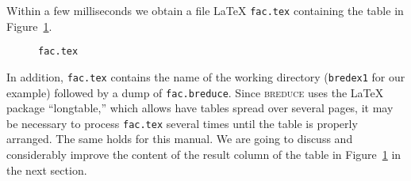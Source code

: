 \documentclass[a4paper]{article}
\begin{document}
Within a few milliseconds we obtain a file \LaTeX{} \texttt{fac.tex}
containing the table in Figure~\ref{FI:fac1}.
\begin{figure}[t]
  \begin{center}
    \caption{\texttt{fac.tex}\label{FI:fac1}}
  \end{center}
\end{figure}
In addition, \texttt{fac.tex} contains the name of the working
directory (\texttt{bredex1} for our example) followed by a dump of
\texttt{fac.breduce}. Since \textsc{breduce} uses the \LaTeX{} package
``longtable,'' which allows have tables spread over several pages, it
may be necessary to process \texttt{fac.tex} several times until the
table is properly arranged. The same holds for this manual. We are
going to discuss and considerably improve the content of the result
column of the table in Figure~\ref{FI:fac1} in the next section.
\end{document}
